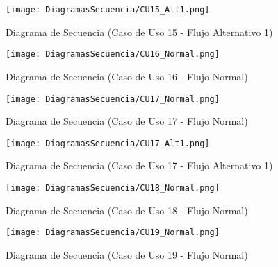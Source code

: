 \begin{landscape}
  \begin{figure}[!htbp]
    \centering
    \texttt{[image: DiagramasSecuencia/CU15\_Alt1.png]}
    \caption{Diagrama de Secuencia (Caso de Uso 15 - Flujo Alternativo 1)}
    \label{fig:Secuencia_CU15_Alt1}
  \end{figure}
\end{landscape}
\FloatBarrier

\begin{landscape}
  \begin{figure}[!htbp]
    \centering
    \texttt{[image: DiagramasSecuencia/CU16\_Normal.png]}
    \caption{Diagrama de Secuencia (Caso de Uso 16 - Flujo Normal)}
    \label{fig:Secuencia_CU16_Normal}
  \end{figure}
\end{landscape}
\FloatBarrier


\begin{landscape}
  \begin{figure}[!htbp]
    \centering
    \texttt{[image: DiagramasSecuencia/CU17\_Normal.png]}
    \caption{Diagrama de Secuencia (Caso de Uso 17 - Flujo Normal)}
    \label{fig:Secuencia_CU17_Normal}
  \end{figure}
\end{landscape}
\FloatBarrier

\begin{landscape}
  \begin{figure}[!htbp]
    \centering
    \texttt{[image: DiagramasSecuencia/CU17\_Alt1.png]}
    \caption{Diagrama de Secuencia (Caso de Uso 17 - Flujo Alternativo 1)}
    \label{fig:Secuencia_CU17_Alt1}
  \end{figure}
\end{landscape}
\FloatBarrier

\begin{landscape}
  \begin{figure}[!htbp]
    \centering
    \texttt{[image: DiagramasSecuencia/CU18\_Normal.png]}
    \caption{Diagrama de Secuencia (Caso de Uso 18 - Flujo Normal)}
    \label{fig:Secuencia_CU18_Normal}
  \end{figure}
\end{landscape}
\FloatBarrier

\begin{landscape}
  \begin{figure}[!htbp]
    \centering
    \texttt{[image: DiagramasSecuencia/CU19\_Normal.png]}
    \caption{Diagrama de Secuencia (Caso de Uso 19 - Flujo Normal)}
    \label{fig:Secuencia_CU19_Normal}
  \end{figure}
\end{landscape}
\FloatBarrier


